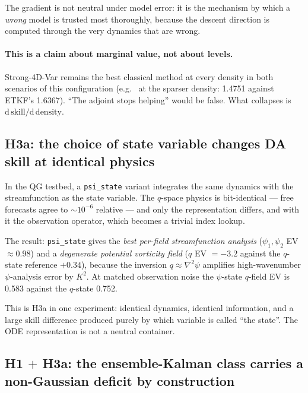 The gradient is not neutral under model error: it is the mechanism by which a
\emph{wrong} model is trusted most thoroughly, because the descent direction is
computed through the very dynamics that are wrong.

\paragraph{This is a claim about marginal value, not about levels.}
Strong-4D-Var remains the best classical method at every density in both
scenarios of this configuration (e.g.\ \So{} at the sparser density: 1.4751
against ETKF's 1.6367). ``The adjoint stops helping'' would be false. What
collapses is $\mathrm{d}\,\text{skill}/\mathrm{d}\,\text{density}$.

\subsection{H3a: the choice of state variable changes DA skill at identical physics}
\label{sec:representation}

In the QG testbed, a \texttt{psi\_state} variant integrates the same dynamics
with the streamfunction as the state variable. The $q$-space physics is
bit-identical --- free forecasts agree to $\sim 10^{-6}$ relative --- and only
the representation differs, and with it the observation operator, which becomes
a trivial index lookup.

The result: \texttt{psi\_state} gives the \emph{best per-field streamfunction
analysis} ($\psi_1, \psi_2$ EV $\approx 0.98$) and a \emph{degenerate potential
vorticity field} ($q$ EV $= -3.2$ against the $q$-state reference $+0.34$),
because the inversion $q \approx \nabla^2 \psi$ amplifies high-wavenumber
$\psi$-analysis error by $K^2$. At matched observation noise the $\psi$-state
$q$-field EV is 0.583 against the $q$-state 0.752.

This is H3a in one experiment: identical dynamics, identical information, and a
large skill difference produced purely by which variable is called ``the
state''. The ODE representation is not a neutral container.

\subsection{H1 $+$ H3a: the ensemble-Kalman class carries a non-Gaussian deficit
by construction}
\label{sec:nongaussian}

